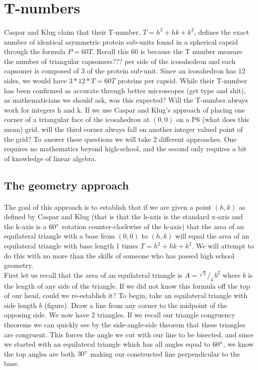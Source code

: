 \documentclass[12pt,letter]{article}
\newcommand*\rfrac[2]{{}^{#1}\!/_{#2}}
\begin{document}
\section{T-numbers}
\paragraph{}
Caspar and Klug claim that their T-number, $T = h^2 + hk + k^2$, defines the exact number of identical asymmetric protein sub-units found in a spherical capsid through the formula $P = 60T$. Recall this 60 is because the T number measure the number of triangular capsomers??? per side of the icosahedron and each capsomer is composed of 3 of the protein sub-unit. Since an icosahedron has 12 sides, we would have $3*12*T = 60T$ proteins per capsid. While their T-number has been confirmed as accurate through better microscopes (get type and shit), as mathematicians we should ask, was this expected? Will the T-number always work for integers h and k. If we use Caspar and Klug's approach of placing one corner of a triangular face of the icosahedron at $(0,0)$ on a P6 (what does this mean) grid, will the third corner always fall on another integer valued point of the grid? To answer these questions we will take 2 different approaches. One requires no mathematics beyond high-school, and the second only requires a bit of knowledge of linear algebra.

\subsection{The geometry approach}

\paragraph{}
The goal of this approach is to establish that if we are given a point $(h,k)$ as defined by Caspar and Klug (that is that the h-axis is the standard x-axis and the k-axis is a $60\degree$ rotation counter-clockwise of the h-axis) that the area of an equilateral triangle with a base from $(0,0)$ to $(h,k)$ will equal the area of an equilateral triangle with base length 1 times $T = h^2 + hk + k^2$. We will attempt to do this with no more than the skills of someone who has passed high school geometry. \\

First let us recall that the area of an equilateral triangle is $A = \rfrac {\sqrt{3}} {4} \, b^2$ where $b$ is the length of any side of the triangle. If we did not know this formula off the top of our head, could we re-establish it? To begin, take an equilateral triangle with side length $b$ (figure). Draw a line from any corner to the midpoint of the opposing side. We now have 2 triangles. If we recall our triangle congruency theorems we can quickly see by the side-angle-side theorem that these triangles are congruent. This forces the angle we cut with our line to be bisected, and since we started with an equilateral triangle which has all angles equal to $60\degree$, we know the top angles are both $30\degree$ making our constructed line perpendicular to the base. \\
\end{document}
